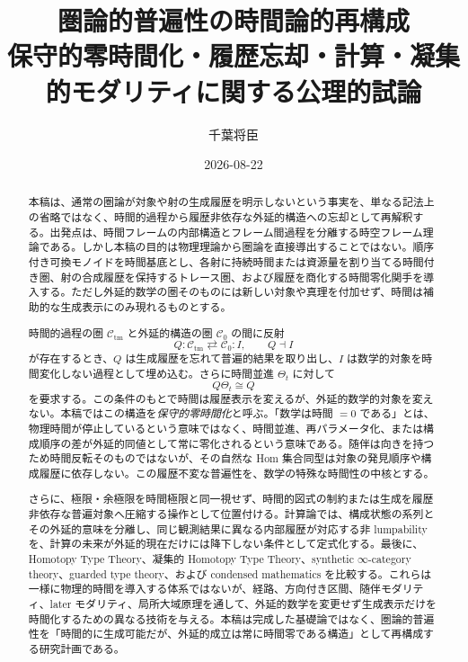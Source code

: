 \documentclass[a4paper,11pt]{ltjsarticle}
\title{圏論的普遍性の時間論的再構成\\
\large 保守的零時間化・履歴忘却・計算・凝集的モダリティに関する公理的試論}
\author{千葉将臣}
\date{2026-08-22}
\theoremstyle{remark}
\newcommand{\C}{\mathcal C}
\begin{document}
\maketitle

\begin{abstract}
本稿は、通常の圏論が対象や射の生成履歴を明示しないという事実を、単なる記法上の省略ではなく、時間的過程から履歴非依存な外延的構造への忘却として再解釈する。出発点は、時間フレームの内部構造とフレーム間過程を分離する時空フレーム理論である。しかし本稿の目的は物理理論から圏論を直接導出することではない。順序付き可換モノイドを時間基底とし、各射に持続時間または資源量を割り当てる時間付き圏、射の合成履歴を保持するトレース圏、および履歴を商化する時間零化関手を導入する。ただし外延的数学の圏そのものには新しい対象や真理を付加せず、時間は補助的な生成表示にのみ現れるものとする。

時間的過程の圏 $\C_{\mathrm{tm}}$ と外延的構造の圏 $\C_0$ の間に反射
\begin{equation*}
 Q:\C_{\mathrm{tm}}\rightleftarrows\C_0:I,
 \qquad Q\dashv I
\end{equation*}
が存在するとき、$Q$ は生成履歴を忘れて普遍的結果を取り出し、$I$ は数学的対象を時間変化しない過程として埋め込む。さらに時間並進 $\Theta_t$ に対して
\begin{equation*}
 Q\Theta_t\cong Q
\end{equation*}
を要求する。この条件のもとで時間は履歴表示を変えるが、外延的数学的対象を変えない。本稿ではこの構造を\emph{保守的零時間化}と呼ぶ。「数学は時間 $=0$ である」とは、物理時間が停止しているという意味ではなく、時間並進、再パラメータ化、または構成順序の差が外延的同値として常に零化されるという意味である。随伴は向きを持つため時間反転そのものではないが、その自然な Hom 集合同型は対象の発見順序や構成履歴に依存しない。この履歴不変な普遍性を、数学の特殊な時間性の中核とする。

さらに、極限・余極限を時間極限と同一視せず、時間的図式の制約または生成を履歴非依存な普遍対象へ圧縮する操作として位置付ける。計算論では、構成状態の系列とその外延的意味を分離し、同じ観測結果に異なる内部履歴が対応する非 lumpability を、計算の未来が外延的現在だけには降下しない条件として定式化する。最後に、Homotopy Type Theory、凝集的 Homotopy Type Theory、synthetic $\infty$-category theory、guarded type theory、および condensed mathematics を比較する。これらは一様に物理的時間を導入する体系ではないが、経路、方向付き区間、随伴モダリティ、later モダリティ、局所大域原理を通して、外延的数学を変更せず生成表示だけを時間化するための異なる技術を与える。本稿は完成した基礎論ではなく、圏論的普遍性を「時間的に生成可能だが、外延的成立は常に時間零である構造」として再構成する研究計画である。
\end{abstract}
\end{document}
